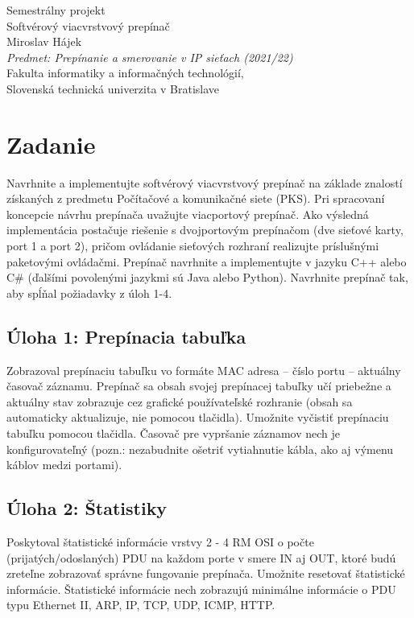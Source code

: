 \documentclass[12pt, a4paper]{article}
\begin{document}
\begin{titlepage}
    \hspace{0pt}
    \vfill
    \centering
    \Large Semestrálny projekt \\ 
    \vspace{0.2cm}
    \huge  Softvérový viacvrstvový prepínač \\
    \vspace{1.2cm}
    \large Miroslav Hájek \\[0.1cm]
	\normalsize \textit{Predmet: Prepínanie a smerovanie v IP sieťach (2021/22)} \\[0.1cm]
	Fakulta informatiky a informačných technológií, \\
	Slovenská technická univerzita v Bratislave
    \vfill
\end{titlepage}
\newpage
\tableofcontents
\newpage
{}
\setcounter{page}{1}

\section{Zadanie}
Navrhnite a implementujte softvérový viacvrstvový prepínač na základe znalostí získaných z predmetu Počítačové
a komunikačné siete (PKS). Pri spracovaní koncepcie návrhu prepínača uvažujte viacportový prepínač. Ako
výsledná implementácia postačuje riešenie s dvojportovým prepínačom (dve sieťové karty, port 1 a port 2),
pričom ovládanie sieťových rozhraní realizujte príslušnými paketovými ovládačmi. Prepínač navrhnite a
implementujte v jazyku C++ alebo C\# (ďalšími povolenými jazykmi sú Java alebo Python). Navrhnite prepínač tak,
aby spĺňal požiadavky z úloh 1-4.

\subsection{Úloha 1: Prepínacia tabuľka} 
Zobrazoval  prepínaciu tabuľku  vo formáte  MAC  adresa  –  číslo portu  –  aktuálny  časovač záznamu. Prepínač sa 
obsah  svojej  prepínacej tabuľky učí priebežne a aktuálny stav  zobrazuje  cez grafické používateľské  rozhranie 
(obsah sa automaticky aktualizuje, nie pomocou tlačidla). Umožnite vyčistiť prepínaciu tabuľku pomocou tlačidla. 
Časovač  pre  vypršanie  záznamov  nech je konfigurovateľný  (pozn.:  nezabudnite  ošetriť vytiahnutie  kábla, ako aj 
výmenu káblov medzi portami). 

\subsection{Úloha 2: Štatistiky}
Poskytoval štatistické informácie vrstvy 2 - 4 RM OSI o počte (prijatých/odoslaných) PDU na každom porte v smere 
IN aj OUT,  ktoré  budú  zreteľne  zobrazovať  správne  fungovanie prepínača.  Umožnite resetovať štatistické 
informácie. Štatistické informácie nech zobrazujú minimálne informácie o PDU  typu  Ethernet  II,  ARP,  IP,  TCP, 
UDP, ICMP, HTTP.
\end{document}

